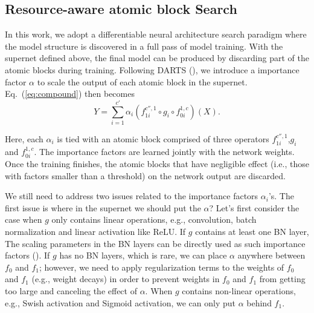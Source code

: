 \documentclass{article} \usepackage{iclr2020_conference,times}
\begin{document}
\subsection{Resource-aware atomic block Search}
\label{sec:flops_targeted_slimming}

In this work, we adopt a differentiable neural architecture search paradigm where the model structure is discovered in a full pass of model training. With the supernet defined above, the final model can be produced by discarding part of the atomic blocks during training. Following DARTS (\cite{hanxiao2019darts}), we introduce a importance factor $\alpha$ to scale the output of each atomic block in the supernet. Eq.~(\ref{eq:compound}) then becomes
\begin{equation}
    Y = \sum_{i=1}^{c'} \alpha_i \left(f_{1i}^{c'',1} \circ g_i \circ f_{0i}^{1,c}\right)(X). \label{eq:weighted}
\end{equation}

Here, each $\alpha_i$ is tied with an atomic block comprised of three operators $f_{1i}^{c'',1}$,$g_i$ and $f_{0i}^{1,c}$. The importance factors are learned jointly with the network weights. Once the training finishes, the atomic blocks that have negligible effect (i.e., those with factors smaller than a threshold) on the network output are discarded.

We still need to address two issues related to the importance factors $\alpha_i$'s. The first issue is where in the supernet we should put the $\alpha$? Let's first consider the case when $g$ only contains linear operations, e.g., convolution, batch normalization and linear activation like ReLU. If $g$ contains at least one BN layer, The scaling parameters in the BN layers can be directly used as such importance factors (\cite{zhuang2017slimming}). If $g$ has no BN layers, which is rare, we can place $\alpha$ anywhere between $f_0$ and $f_1$; however, we need to apply regularization terms to the weights of $f_0$ and $f_1$ (e.g., weight decays) in order to prevent weights in $f_0$ and $f_1$ from getting too large and canceling the effect of $\alpha$. When $g$ contains non-linear operations, e.g., Swish activation and Sigmoid activation, we can only put $\alpha$ behind $f_1$.
\end{document}

